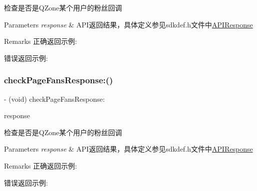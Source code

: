 检查是否是\+Q\+Zone某个用户的粉丝回调 
\begin{DoxyParams}{Parameters}
{\em response} & A\+P\+I返回结果，具体定义参见sdkdef.\+h文件中\mbox{\hyperlink{interface_a_p_i_response}{A\+P\+I\+Response}} \\
\hline
\end{DoxyParams}
\begin{DoxyRemark}{Remarks}
正确返回示例\+: 
\begin{DoxyCodeInclude}
\end{DoxyCodeInclude}
 错误返回示例\+: 
\begin{DoxyCodeInclude}
\end{DoxyCodeInclude}

\end{DoxyRemark}
\mbox{\label{protocol_tencent_session_delegate-p_a3180b739637e48ae4c986eb98caa3307}} 
\subsubsection{\texorpdfstring{check\+Page\+Fans\+Response\+:()}{checkPageFansResponse:()}\hspace{0.1cm}{\footnotesize\ttfamily [2/2]}}
{\footnotesize\ttfamily -\/ (void) check\+Page\+Fans\+Response\+: \begin{DoxyParamCaption}\item[{(\mbox{\hyperlink{interface_a_p_i_response}{A\+P\+I\+Response}} $\ast$)}]{response }\end{DoxyParamCaption}\hspace{0.3cm}{\ttfamily [optional]}}

检查是否是\+Q\+Zone某个用户的粉丝回调 
\begin{DoxyParams}{Parameters}
{\em response} & A\+P\+I返回结果，具体定义参见sdkdef.\+h文件中\mbox{\hyperlink{interface_a_p_i_response}{A\+P\+I\+Response}} \\
\hline
\end{DoxyParams}
\begin{DoxyRemark}{Remarks}
正确返回示例\+: 
\begin{DoxyCodeInclude}
\end{DoxyCodeInclude}
 错误返回示例\+: 
\begin{DoxyCodeInclude}
\end{DoxyCodeInclude}

\end{DoxyRemark}
\mbox{\label{protocol_tencent_session_delegate-p_a51e1be4e15865ec6c54748596fffd5df}} 

